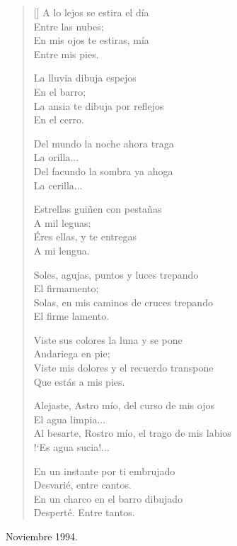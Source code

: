 \documentclass[a4paper,11pt]{article}
\begin{document}

\settowidth{\versewidth}{Al besarte, Rostro mío, el trago de mis labios}

\bigskip

\begin{verse}[\versewidth]
A lo lejos se estira el día \\
\qquad Entre las nubes; \\
En mis ojos te estiras, mía \\
\qquad Entre mis pies.

La lluvia dibuja espejos \\
\qquad En el barro; \\
La ansia te dibuja por reflejos \\
\qquad En el cerro.

Del mundo la noche ahora traga \\
\qquad La orilla... \\
Del facundo la sombra ya ahoga \\
\qquad La cerilla...

Estrellas guiñen con pestañas \\
\qquad A mil leguas; \\
Éres ellas, y te entregas \\
\qquad A mi lengua.

Soles, agujas, puntos y luces trepando \\
\qquad El firmamento; \\
Solas, en mis caminos de cruces trepando \\
\qquad El firme lamento.

Viste sus colores la luna y se pone \\
\qquad Andariega en pie; \\
Viste mis dolores y el recuerdo transpone \\
\qquad Que estás a mis pies.

Alejaste, Astro mío, del curso de mis ojos \\
\qquad El agua limpia... \\
Al besarte, Rostro mío, el trago de mis labios \\
\qquad !`Es agua sucia!...

En un instante por ti embrujado \\
\qquad Desvarié, entre cantos. \\
En un charco en el barro dibujado \\
\qquad Desperté. Entre tantos.
\end{verse}

\bigskip \bigskip \qquad Noviembre 1994.
\end{document}
